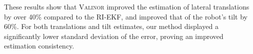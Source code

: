 \documentclass[10pt,twocolumn]{ICCAS}
\begin{document}
These results show that {\scshape Valinor} improved the estimation of lateral translations by over 40\% compared to the RI-EKF, and improved that of the robot's tilt by 60\%. For both translations and tilt estimates, our method displayed a significantly lower standard deviation of the error, proving an improved estimation consistency. 


%










\end{document}
